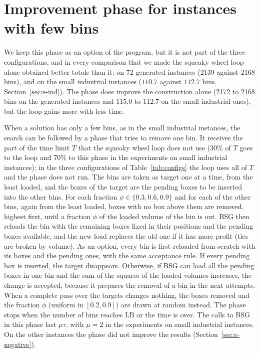 \section{Improvement phase for instances with few bins}
\label{app:improve}

We keep this phase as an option of the program, but it is not part of the three configurations, and in every comparison that we made the squeaky wheel loop alone obtained better totals than it: on 72 generated instances (2139 against 2168 bins), and
on the small industrial instances ($110.7$ against $112.7$ bins, Section~\ref{sec:e-ind}). The phase does improve the construction alone (2172 to 2168 bins on the generated instances and 115.0 to 112.7 on the small industrial ones), but the loop gains more with less time.

When a solution has only a few bins, as in the small industrial instances, the search can be
followed by a phase that tries to remove one bin. It receives the part of the time limit $T$ that
the squeaky wheel loop does not use (30\% of $T$ goes to the loop and 70\% to this phase in the
experiments on small industrial instances); in the three configurations of Table~\ref{tab:configs}
the loop uses all of $T$ and the phase does not run. The bins are taken as target one at a time,
from the least loaded, and the boxes of the target are the pending boxes to be inserted into the
other bins. For each fraction $\phi\in\{0.3,0.6,0.9\}$ and for each of the other bins, again from
the least loaded, boxes with no box above them are removed, highest first, until a fraction $\phi$
of the loaded volume of the bin is out. BSG then reloads the bin with the remaining boxes fixed in
their positions and the pending boxes available, and the new load replaces the old one if it has
more profit (ties are broken by volume). As an option, every bin is first reloaded from scratch with
its boxes and the pending ones, with the same acceptance rule. If every pending box is inserted, the
target disappears. Otherwise, if BSG can load all the pending boxes in one bin and the sum of the
squares of the loaded volumes increases, the change is accepted, because it prepares the removal of
a bin in the next attempts. When a complete pass over the targets changes nothing, the boxes
removed and the fraction $\phi$ (uniform in $[0.2,0.9]$) are drawn at random instead. The phase
stops when the number of bins reaches $\mathrm{LB}$ or the time is over. The calls to BSG in this
phase last $\mu\tau$, with $\mu=2$ in the experiments on small industrial instances. On the other
instances the phase did not improve the results (Section~\ref{sec:e-negative}).
